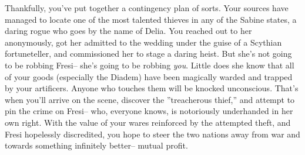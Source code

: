 \documentclass[char]{Kos}
\begin{document}
Thankfully, you've put together a contingency plan of sorts. Your sources have managed to locate one of the most talented thieves in any of the Sabine states, a daring rogue who goes by the name of Delia. You reached out to her anonymously, got her admitted to the wedding under the guise of a Scythian fortuneteller, and commissioned her to stage a daring heist. But she's not going to be robbing Fresi-- she's going to be robbing \textit{you}. Little does she know that all of your goods (especially the Diadem) have been magically warded and trapped by your artificers. Anyone who touches them will be knocked unconscious. That's when you'll arrive on the scene, discover the ''treacherous thief,'' and attempt to pin the crime on Fresi-- who, everyone knows, is notoriously underhanded in her own right. With the value of your wares reinforced by the attempted theft, and Fresi hopelessly discredited, you hope to steer the two nations away from war and towards something infinitely better-- mutual profit.
\end{document}
